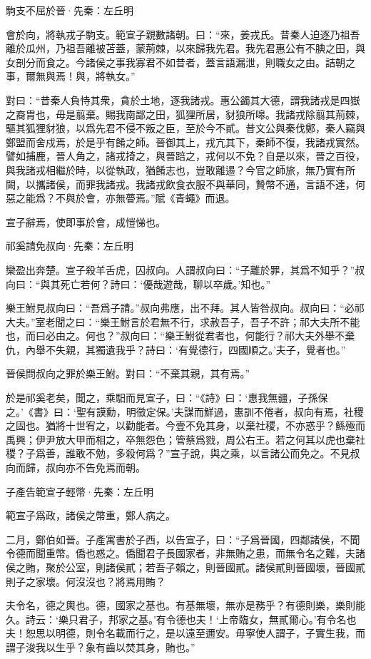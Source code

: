 \documentclass[12pt,a4paper]{ctexbook}
\begin{document}
駒支不屈於晉·先秦：左丘明 \par
會於向，將執戎子駒支。範宣子親數諸朝。曰：“來，姜戎氏。昔秦人迫逐乃祖吾離於瓜州，乃祖吾離被苫蓋，蒙荊棘，以來歸我先君。我先君惠公有不腆之田，與女剖分而食之。今諸侯之事我寡君不如昔者，蓋言語漏泄，則職女之由。詰朝之事，爾無與焉！與，將執女。”\par
對曰：“昔秦人負恃其衆，貪於土地，逐我諸戎。惠公蠲其大德，謂我諸戎是四嶽之裔胄也，毋是翦棄。賜我南鄙之田，狐狸所居，豺狼所嗥。我諸戎除翦其荊棘，驅其狐狸豺狼，以爲先君不侵不叛之臣，至於今不貳。昔文公與秦伐鄭，秦人竊與鄭盟而舍戍焉，於是乎有餚之師。晉御其上，戎亢其下，秦師不復，我諸戎實然。譬如捕鹿，晉人角之，諸戎掎之，與晉踣之，戎何以不免？自是以來，晉之百役，與我諸戎相繼於時，以從執政，猶餚志也，豈敢離逷？今官之師旅，無乃實有所闕，以攜諸侯，而罪我諸戎。我諸戎飲食衣服不與華同，贄幣不通，言語不達，何惡之能爲？不與於會，亦無瞢焉。”賦《青蠅》而退。\par
宣子辭焉，使即事於會，成愷悌也。\par
祁奚請免叔向·先秦：左丘明 \par
欒盈出奔楚。宣子殺羊舌虎，囚叔向。人謂叔向曰：“子離於罪，其爲不知乎？”叔向曰：“與其死亡若何？詩曰：‘優哉遊哉，聊以卒歲。’知也。”\par
樂王鮒見叔向曰：“吾爲子請。”叔向弗應，出不拜。其人皆咎叔向。叔向曰：“必祁大夫。”室老聞之曰：“樂王鮒言於君無不行，求赦吾子，吾子不許；祁大夫所不能也，而曰必由之。何也？”叔向曰：“樂王鮒從君者也，何能行？祁大夫外舉不棄仇，內舉不失親，其獨遺我乎？詩曰：‘有覺德行，四國順之。’夫子，覺者也。”\par
晉侯問叔向之罪於樂王鮒。對曰：“不棄其親，其有焉。”\par
於是祁奚老矣，聞之，乘馹而見宣子，曰：“《詩》曰：‘惠我無疆，子孫保之。’《書》曰：‘聖有謨勳，明徵定保。’夫謀而鮮過，惠訓不倦者，叔向有焉，社稷之固也。猶將十世宥之，以勸能者。今壹不免其身，以棄社稷，不亦惑乎？鯀殛而禹興；伊尹放大甲而相之，卒無怨色；管蔡爲戮，周公右王。若之何其以虎也棄社稷？子爲善，誰敢不勉，多殺何爲？”宣子說，與之乘，以言諸公而免之。不見叔向而歸，叔向亦不告免焉而朝。\par
子產告範宣子輕幣·先秦：左丘明 \par
範宣子爲政，諸侯之幣重，鄭人病之。\par
二月，鄭伯如晉。子產寓書於子西，以告宣子，曰：“子爲晉國，四鄰諸侯，不聞令德而聞重幣。僑也惑之。僑聞君子長國家者，非無賄之患，而無令名之難，夫諸侯之賄，聚於公室，則諸侯貳；若吾子賴之，則晉國貳。諸侯貳則晉國壞，晉國貳則子之家壞。何沒沒也？將焉用賄？\par
夫令名，德之輿也。德，國家之基也。有基無壞，無亦是務乎？有德則樂，樂則能久。詩云：‘樂只君子，邦家之基。’有令德也夫！‘上帝臨女，無貳爾心。’有令名也夫！恕思以明德，則令名載而行之，是以遠至邇安。毋寧使人謂子，子實生我，而謂子浚我以生乎？象有齒以焚其身，賄也。”\par
\end{document}
